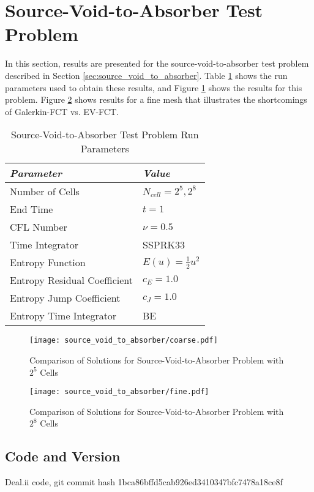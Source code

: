 \section{Source-Void-to-Absorber Test Problem}

In this section, results are presented for the
source-void-to-absorber test problem
described in Section \ref{sec:source_void_to_absorber}.
Table \ref{tab:source_void_to_absorber_run_parameters}
shows the run parameters used
to obtain these results, and Figure \ref{fig:source_void_to_absorber}
shows the results for this problem. Figure
\ref{fig:source_void_to_absorber_fine} shows results
for a fine mesh that illustrates the shortcomings of Galerkin-FCT
vs. EV-FCT.

\begin{table}[ht]\caption{Source-Void-to-Absorber Test Problem Run Parameters}
\label{tab:source_void_to_absorber_run_parameters}
\centering
\begin{tabular}{l l}\toprule
\emph{Parameter} & \emph{Value}\\\midrule
Number of Cells & $N_{cell} = 2^5, 2^8$\\
End Time & $t = 1$\\
CFL Number & $\nu = 0.5$\\
Time Integrator & SSPRK33\\\midrule
Entropy Function & $E(u) = \frac{1}{2}u^2$\\
Entropy Residual Coefficient & $c_E = 1.0$\\
Entropy Jump Coefficient & $c_J = 1.0$\\
Entropy Time Integrator & BE\\
\bottomrule\end{tabular}
\end{table}
\begin{figure}[ht]
   \texttt{[image: source\_void\_to\_absorber/coarse.pdf]}
   \caption{Comparison of Solutions for Source-Void-to-Absorber Problem
     with $2^5$ Cells}
   \label{fig:source_void_to_absorber}
\end{figure}
\begin{figure}[ht]
   \texttt{[image: source\_void\_to\_absorber/fine.pdf]}
   \caption{Comparison of Solutions for Source-Void-to-Absorber Problem
     with $2^8$ Cells}
   \label{fig:source_void_to_absorber_fine}
\end{figure}
\subsection{Code and Version}
Deal.ii code, git commit hash 1bca86bffd5cab926ed3410347bfc7478a18ce8f
